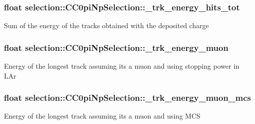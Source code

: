 \subsubsection[{\texorpdfstring{\+\_\+trk\+\_\+energy\+\_\+hits\+\_\+tot}{_trk_energy_hits_tot}}]{\setlength{\rightskip}{0pt plus 5cm}float selection\+::\+C\+C0pi\+Np\+Selection\+::\+\_\+trk\+\_\+energy\+\_\+hits\+\_\+tot\hspace{0.3cm}{\ttfamily [private]}}\hypertarget{classselection_1_1CC0piNpSelection_a82a48c6128c34252642d237b98f1b66a}{}\label{classselection_1_1CC0piNpSelection_a82a48c6128c34252642d237b98f1b66a}
Sum of the energy of the tracks obtained with the deposited charge 
\subsubsection[{\texorpdfstring{\+\_\+trk\+\_\+energy\+\_\+muon}{_trk_energy_muon}}]{\setlength{\rightskip}{0pt plus 5cm}float selection\+::\+C\+C0pi\+Np\+Selection\+::\+\_\+trk\+\_\+energy\+\_\+muon\hspace{0.3cm}{\ttfamily [private]}}\hypertarget{classselection_1_1CC0piNpSelection_aabcb2e3b6df63f077fc37d881c1794a3}{}\label{classselection_1_1CC0piNpSelection_aabcb2e3b6df63f077fc37d881c1794a3}
Energy of the longest track assuming it\textquotesingle{}s a muon and using stopping power in L\+Ar 
\subsubsection[{\texorpdfstring{\+\_\+trk\+\_\+energy\+\_\+muon\+\_\+mcs}{_trk_energy_muon_mcs}}]{\setlength{\rightskip}{0pt plus 5cm}float selection\+::\+C\+C0pi\+Np\+Selection\+::\+\_\+trk\+\_\+energy\+\_\+muon\+\_\+mcs\hspace{0.3cm}{\ttfamily [private]}}\hypertarget{classselection_1_1CC0piNpSelection_a4ae8946bcc37ce152c81ba3c28d60fbb}{}\label{classselection_1_1CC0piNpSelection_a4ae8946bcc37ce152c81ba3c28d60fbb}
Energy of the longest track assuming it\textquotesingle{}s a muon and using M\+CS 
